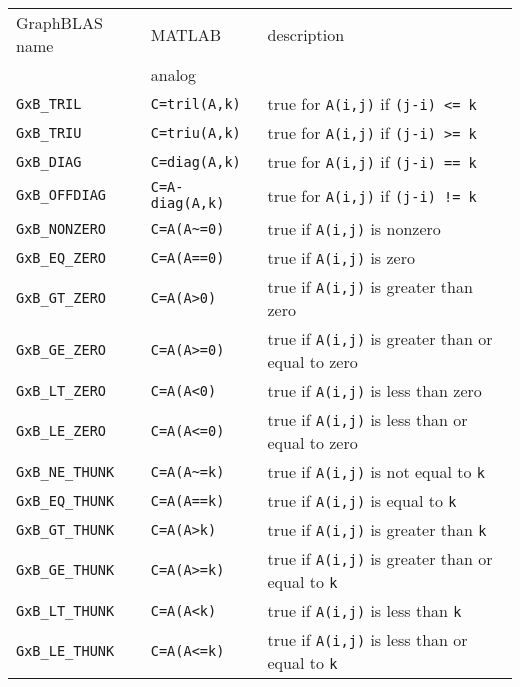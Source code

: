 \documentclass[12pt]{article}
\begin{document}
\vspace{0.2in}
{\footnotesize
\begin{tabular}{lll}
\hline
GraphBLAS name          & MATLAB            & description \\
                        & analog            & \\
\hline
\verb'GxB_TRIL'         & \verb'C=tril(A,k)'   & true for \verb'A(i,j)' if \verb'(j-i) <= k' \\
\verb'GxB_TRIU'         & \verb'C=triu(A,k)'   & true for \verb'A(i,j)' if \verb'(j-i) >= k' \\
\verb'GxB_DIAG'         & \verb'C=diag(A,k)'   & true for \verb'A(i,j)' if \verb'(j-i) == k' \\
\verb'GxB_OFFDIAG'      & \verb'C=A-diag(A,k)' & true for \verb'A(i,j)' if \verb'(j-i) != k' \\
%
\verb'GxB_NONZERO'      & \verb'C=A(A~=0)'     & true if \verb'A(i,j)' is nonzero\\
\verb'GxB_EQ_ZERO'      & \verb'C=A(A==0)'     & true if \verb'A(i,j)' is zero\\
\verb'GxB_GT_ZERO'      & \verb'C=A(A>0)'      & true if \verb'A(i,j)' is greater than zero \\
\verb'GxB_GE_ZERO'      & \verb'C=A(A>=0)'     & true if \verb'A(i,j)' is greater than or equal to zero \\
\verb'GxB_LT_ZERO'      & \verb'C=A(A<0)'      & true if \verb'A(i,j)' is less than zero \\
\verb'GxB_LE_ZERO'      & \verb'C=A(A<=0)'     & true if \verb'A(i,j)' is less than or equal to zero \\
%
\verb'GxB_NE_THUNK'     & \verb'C=A(A~=k)'     & true if \verb'A(i,j)' is not equal to \verb'k'\\
\verb'GxB_EQ_THUNK'     & \verb'C=A(A==k)'     & true if \verb'A(i,j)' is equal to \verb'k'\\
\verb'GxB_GT_THUNK'     & \verb'C=A(A>k)'      & true if \verb'A(i,j)' is greater than \verb'k' \\
\verb'GxB_GE_THUNK'     & \verb'C=A(A>=k)'     & true if \verb'A(i,j)' is greater than or equal to \verb'k' \\
\verb'GxB_LT_THUNK'     & \verb'C=A(A<k)'      & true if \verb'A(i,j)' is less than \verb'k' \\
\verb'GxB_LE_THUNK'     & \verb'C=A(A<=k)'     & true if \verb'A(i,j)' is less than or equal to \verb'k' \\
%
\hline
\end{tabular}
}
\vspace{0.2in}
\end{document}
